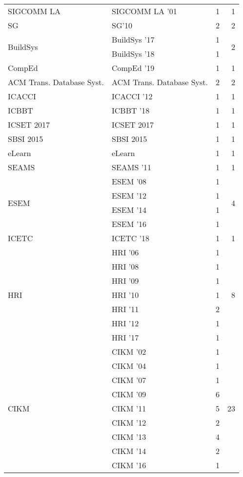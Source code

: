 \begin{table*}[t]
\begin{tabular}{llrr}
\multirow{1}{*}{SIGCOMM LA } & SIGCOMM LA '01 & 1 & \multirow{1}{*}{1}\\
\multirow{1}{*}{SG} & SG'10 & 2 & \multirow{1}{*}{2}\\
\multirow{2}{*}{BuildSys } & BuildSys '17 & 1 & \multirow{2}{*}{2}\\
& BuildSys '18 & 1 &\\
\multirow{1}{*}{CompEd } & CompEd '19 & 1 & \multirow{1}{*}{1}\\
\multirow{1}{*}{ACM Trans. Database Syst.} & ACM Trans. Database Syst. & 2 & \multirow{1}{*}{2}\\
\multirow{1}{*}{ICACCI } & ICACCI '12 & 1 & \multirow{1}{*}{1}\\
\multirow{1}{*}{ICBBT } & ICBBT '18 & 1 & \multirow{1}{*}{1}\\
\multirow{1}{*}{ICSET 2017} & ICSET 2017 & 1 & \multirow{1}{*}{1}\\
\multirow{1}{*}{SBSI 2015} & SBSI 2015 & 1 & \multirow{1}{*}{1}\\
\multirow{1}{*}{eLearn} & eLearn & 1 & \multirow{1}{*}{1}\\
\multirow{1}{*}{SEAMS } & SEAMS '11 & 1 & \multirow{1}{*}{1}\\
\multirow{4}{*}{ESEM } & ESEM '08 & 1 & \multirow{4}{*}{4}\\
& ESEM '12 & 1 &\\
& ESEM '14 & 1 &\\
& ESEM '16 & 1 &\\
\multirow{1}{*}{ICETC } & ICETC '18 & 1 & \multirow{1}{*}{1}\\
\multirow{7}{*}{HRI } & HRI '06 & 1 & \multirow{7}{*}{8}\\
& HRI '08 & 1 &\\
& HRI '09 & 1 &\\
& HRI '10 & 1 &\\
& HRI '11 & 2 &\\
& HRI '12 & 1 &\\
& HRI '17 & 1 &\\
\multirow{9}{*}{CIKM } & CIKM '02 & 1 & \multirow{9}{*}{23}\\
& CIKM '04 & 1 &\\
& CIKM '07 & 1 &\\
& CIKM '09 & 6 &\\
& CIKM '11 & 5 &\\
& CIKM '12 & 2 &\\
& CIKM '13 & 4 &\\
& CIKM '14 & 2 &\\
& CIKM '16 & 1 &\\

\end{tabular}
\end{table*}
